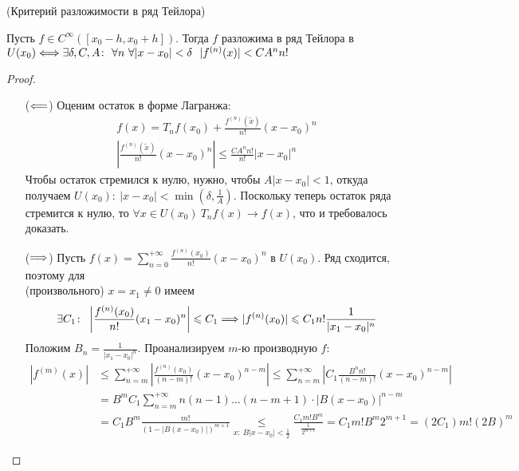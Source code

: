\begin{theorem}(Критерий разложимости в ряд Тейлора)

    Пусть $f \in C^{\infty}([x_0 - h, x_0 + h])$. Тогда $f$ разложима в ряд
    Тейлора в $U(x_0) \Longleftrightarrow \exists \delta, C, A\colon~ \forall n~
    \forall |x - x_0| < \delta~~ |f^{(n)}(x)| < C A^n n!$
\end{theorem}
\begin{proof}
    \enewline
    \begin{itemize}
        \item[($\Longleftarrow$)] Оценим остаток в форме Лагранжа:
\begin{align*}
    f(x) = T_nf(x_0) + \frac{f^{(n)}(\tilde{x})}{n!}(x - x_0)^n \\
    \left|\frac{f^{(n)}(\tilde{x})}{n!}(x - x_0)^n\right| \leqslant
    \frac{CA^n n!}{n!}|x - x_0|^n
\end{align*}
    Чтобы остаток стремился к нулю, нужно, чтобы $A|x - x_0| < 1$, откуда
    получаем $U(x_0)\colon~ |x - x_0| < \min(\delta, \frac{1}{A})$. Поскольку
    теперь остаток ряда стремится к нулю, то $\forall x \in U(x_0)~
    T_nf(x) \to f(x)$, что и требовалось доказать.
        \item[($\Longrightarrow$)] Пусть $\displaystyle f(x) = \sum_{n = 0}^{+\infty}
        {\frac{f^{(n)}(x_0)}{n!}(x - x_0)^n}$ в $U(x_0)$. Ряд сходится, поэтому
        для \\ (произвольного) $x = x_1 \neq 0$ имеем
\[
    \exists C_1\colon~ \left|\frac{f^{(n)}(x_0)}{n!}(x_1 - x_0)^n\right| \leqslant
    C_1 \Longrightarrow |f^{(n)}(x_0)| \leqslant C_1 n! \frac{1}{|x_1 - x_0|^n}
\]
        Положим $\displaystyle B_n = \frac{1}{|x_1 - x_0|^n}$. Проанализируем
        $m$-ю производную $f$:
\begin{align*}
    |f^{(m)}(x)| &\leqslant \sum_{n = m}^{+\infty}
    {\left|\frac{f^{(n)}(x_0)}{(n - m)!}(x - x_0)^{n - m}\right|}
    \leqslant \sum_{n = m}^{+\infty}{\left|C_1 \frac{B^n n!}{(n - m)!}(x - x_0)^{n
    - m}\right|} \\
    &= B^m C_1 \sum_{n = m}^{+\infty}{n(n - 1)\ldots(n - m + 1) \cdot |B(x -
    x_0)|^{n - m}} \\
    &= C_1 B^m \frac{m!}{(1 - |B(x - x_0)|)^{m + 1}}
    \underset{x\colon~ B|x - x_0| < \frac{1}{2}}{\leqslant} \frac{C_1 m!
    B^m}{\frac{1}{2^{m + 1}}} = C_1 m! B^m 2^{m + 1} = (2C_1)m! (2B)^m
\end{align*}
\end{itemize}
\end{proof}

